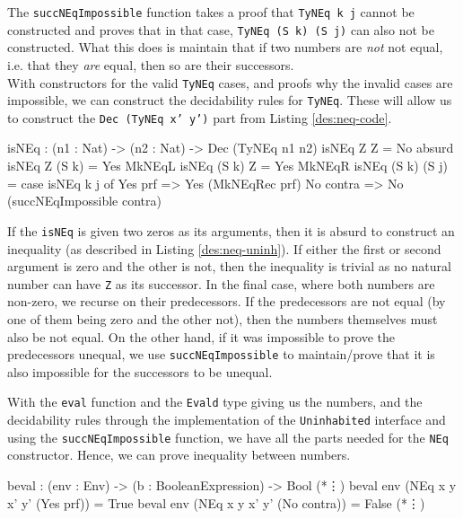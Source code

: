         The \texttt{succNEqImpossible} function takes a proof that \texttt{TyNEq k j} cannot be constructed and proves that in that case, \texttt{TyNEq (S k) (S j)} can also not be constructed. What this does is maintain that if two numbers are \textit{not} not equal, i.e. that they \textit{are} equal, then so are their successors.\\
        With constructors for the valid \texttt{TyNEq} cases, and proofs why the invalid cases are impossible, we can construct the decidability rules for \texttt{TyNEq}. These will allow us to construct the \texttt{Dec (TyNEq x' y')} part from Listing \ref{des:neq-code}.
        
        \begin{code}[caption={Decidability rules for \texttt{NEq}}]
isNEq : (n1 : Nat) -> (n2 : Nat) -> Dec (TyNEq n1 n2)
isNEq Z Z         = No absurd
isNEq Z (S k)     = Yes MkNEqL
isNEq (S k) Z     = Yes MkNEqR
isNEq (S k) (S j) = case isNEq k j of
                        Yes prf   => Yes (MkNEqRec prf)
                        No contra => No (succNEqImpossible contra)
        \end{code}
        
        If the \texttt{isNEq} is given two zeros as its arguments, then it is absurd to construct an inequality (as described in Listing \ref{des:neq-uninh}). If either the first or second argument is zero and the other is not, then the inequality is trivial as no natural number can have \texttt{Z} as its successor. In the final case, where both numbers are non-zero, we recurse on their predecessors. If the predecessors are not equal (by one of them being zero and the other not), then the numbers themselves must also be not equal. On the other hand, if it was impossible to prove the predecessors unequal, we use \texttt{succNEqImpossible} to maintain/prove that it is also impossible for the successors to be unequal.
        \\\par
        
        With the \texttt{eval} function and the \texttt{Evald} type giving us the numbers, and the decidability rules through the implementation of the \texttt{Uninhabited} interface and using the \texttt{succNEqImpossible} function, we have all the parts needed for the \texttt{NEq} constructor. Hence, we can prove inequality between numbers.
        
        \begin{code}[caption={Evaluating \texttt{NEq} over an environment}, escapeinside={(*}{*)}]
        beval : (env : Env) -> (b : BooleanExpression) -> Bool
        (*\vdots*)
        beval env (NEq x y x' y' (Yes prf))   = True
        beval env (NEq x y x' y' (No contra)) = False
        (*\vdots*)
        \end{code}
    
